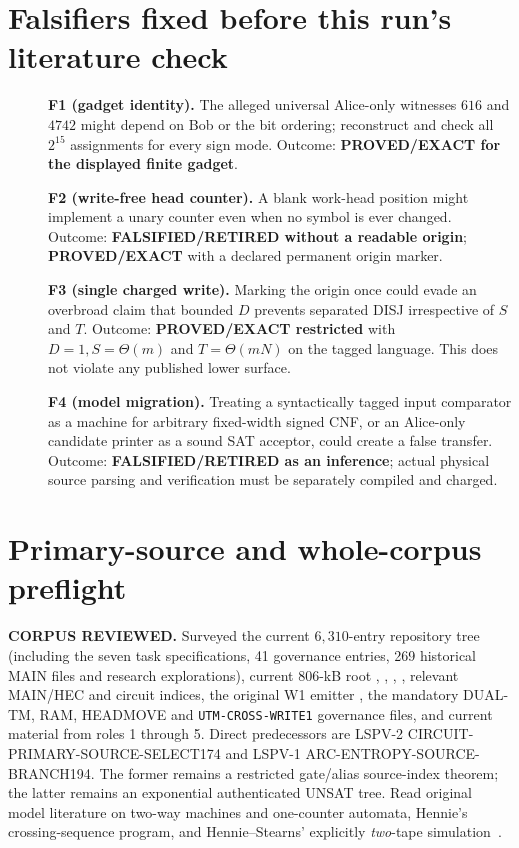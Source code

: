 \documentclass[11pt]{article}
\begin{document}
\section{Falsifiers fixed before this run's literature check}
\begin{description}
\item[] \textbf{F1 (gadget identity).} The alleged universal Alice-only witnesses $616$ and $4742$ might depend on Bob or the bit ordering; reconstruct and check all $2^{15}$ assignments for every sign mode. Outcome: \textbf{PROVED/EXACT for the displayed finite gadget}.
\item[] \textbf{F2 (write-free head counter).} A blank work-head position might implement a unary counter even when no symbol is ever changed. Outcome: \textbf{FALSIFIED/RETIRED without a readable origin}; \textbf{PROVED/EXACT} with a declared permanent origin marker.
\item[] \textbf{F3 (single charged write).} Marking the origin once could evade an overbroad claim that bounded $D$ prevents separated DISJ irrespective of $S$ and $T$. Outcome: \textbf{PROVED/EXACT restricted} with $D=1,S=\Theta(m)$ and $T=\Theta(mN)$ on the tagged language. This does not violate any published lower surface.
\item[] \textbf{F4 (model migration).} Treating a syntactically tagged input comparator as a machine for arbitrary fixed-width signed CNF, or an Alice-only candidate printer as a sound SAT acceptor, could create a false transfer. Outcome: \textbf{FALSIFIED/RETIRED as an inference}; actual physical source parsing and verification must be separately compiled and charged.
\end{description}

\section{Primary-source and whole-corpus preflight}
\textbf{CORPUS REVIEWED.} Surveyed the current $6{,}310$-entry repository tree (including the seven task specifications, 41 governance entries, 269 historical MAIN files and research explorations), current 806-kB root , , , , relevant MAIN/HEC and circuit indices, the original W1 emitter , the mandatory DUAL-TM, RAM, HEADMOVE and \texttt{UTM-CROSS-WRITE1} governance files, and current material from roles 1 through 5. Direct predecessors are LSPV-2 CIRCUIT-PRIMARY-SOURCE-SELECT174 and LSPV-1 ARC-ENTROPY-SOURCE-BRANCH194. The former remains a restricted gate/alias source-index theorem; the latter remains an exponential authenticated UNSAT tree. Read original model literature on two-way machines and one-counter automata, Hennie's crossing-sequence program, and Hennie--Stearns' explicitly \emph{two}-tape simulation~\cite{hennie,hs,counter}.
\end{document}
